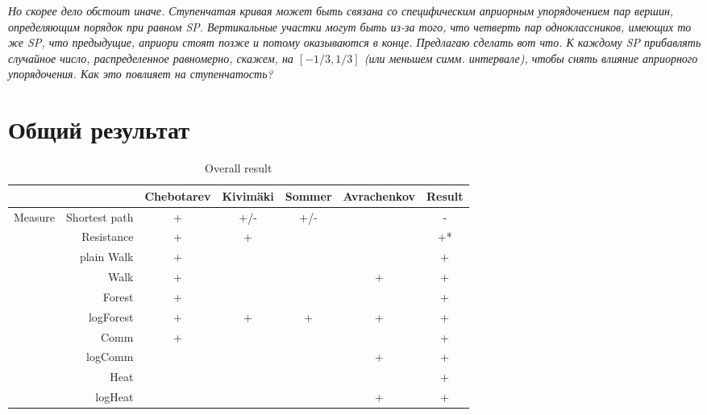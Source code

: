 \documentclass{article}
\begin{document}
\textit{Но скорее дело обстоит иначе. Ступенчатая кривая может быть связана со специфическим априорным упорядочением пар вершин, определяющим порядок при равном SP. Вертикальные участки могут быть из-за того, что четверть пар одноклассников, имеющих то же SP, что предыдущие, априори стоят позже и потому оказываются в конце. Предлагаю сделать вот что. К каждому SP прибавлять случайное число, распределенное равномерно, скажем, на $[-1/3, 1/3]$ (или меньшем симм. интервале), чтобы снять влияние априорного упорядочения. Как это повлияет на ступенчатость?}


\section*{Общий результат}

\begin{table}[H]
\centering
\caption{Overall result}
\label{my-label}
\begin{tabular}{rr|cccc|c}
                &                          & Chebotarev & Kivim{\"a}ki & Sommer & Avrachenkov & Result \\
                \hline
\multirow{18}{*}{Measure} & Shortest path  & +          & \cellcolor{red!25} +/- & \cellcolor{red!25} +/- & & \cellcolor{red!25} - \\
                & Resistance               & +          & +        &        &             & \cellcolor{yellow!25} +* \\
                & plain Walk               & +          &          &        &             & +      \\
                & Walk                     & +          &          &        & +           & +      \\
                & Forest                   & +          &          &        &             & +      \\
                & logForest                & +          & +        & +      & +           & +      \\
                & Comm                     & +          &          &        &             & +      \\
                & logComm                  &            &          &        & +           & +      \\
                & Heat                     &            &          &        &             & \cellcolor{yellow!25} + \\
                & logHeat                  &            &          &        & +           & +      \\

\end{tabular}
\end{table}
\end{document}
